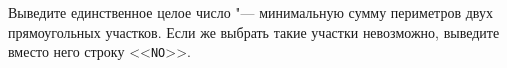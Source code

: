Выведите единственное целое число "--- минимальную сумму периметров двух
прямоугольных участков. Если же выбрать такие участки невозможно, выведите
вместо него строку <<\texttt{NO}>>.


